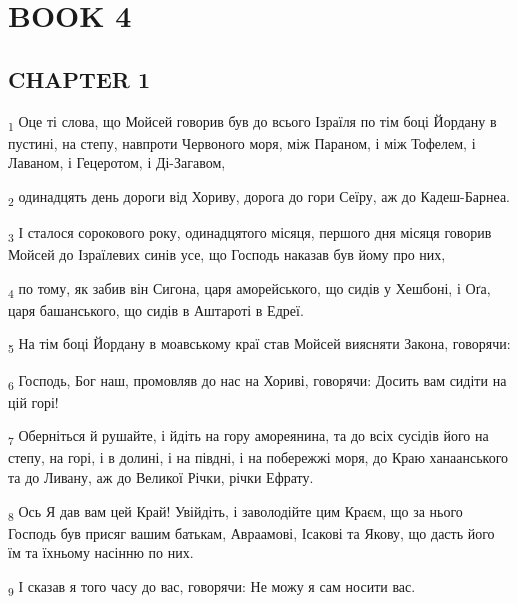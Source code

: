 \section{BOOK 4}
\subsection{CHAPTER 1}
\begin{tcolorbox}
\textsubscript{1} Оце ті слова, що Мойсей говорив був до всього Ізраїля по тім боці Йордану в пустині, на степу, навпроти Червоного моря, між Параном, і між Тофелем, і Лаваном, і Гецеротом, і Ді-Загавом,
\end{tcolorbox}
\begin{tcolorbox}
\textsubscript{2} одинадцять день дороги від Хориву, дорога до гори Сеїру, аж до Кадеш-Барнеа.
\end{tcolorbox}
\begin{tcolorbox}
\textsubscript{3} І сталося сорокового року, одинадцятого місяця, першого дня місяця говорив Мойсей до Ізраїлевих синів усе, що Господь наказав був йому про них,
\end{tcolorbox}
\begin{tcolorbox}
\textsubscript{4} по тому, як забив він Сигона, царя аморейського, що сидів у Хешбоні, і Оґа, царя башанського, що сидів в Аштароті в Едреї.
\end{tcolorbox}
\begin{tcolorbox}
\textsubscript{5} На тім боці Йордану в моавському краї став Мойсей виясняти Закона, говорячи:
\end{tcolorbox}
\begin{tcolorbox}
\textsubscript{6} Господь, Бог наш, промовляв до нас на Хориві, говорячи: Досить вам сидіти на цій горі!
\end{tcolorbox}
\begin{tcolorbox}
\textsubscript{7} Оберніться й рушайте, і йдіть на гору амореянина, та до всіх сусідів його на степу, на горі, і в долині, і на півдні, і на побережжі моря, до Краю ханаанського та до Ливану, аж до Великої Річки, річки Ефрату.
\end{tcolorbox}
\begin{tcolorbox}
\textsubscript{8} Ось Я дав вам цей Край! Увійдіть, і заволодійте цим Краєм, що за нього Господь був присяг вашим батькам, Авраамові, Ісакові та Якову, що дасть його їм та їхньому насінню по них.
\end{tcolorbox}
\begin{tcolorbox}
\textsubscript{9} І сказав я того часу до вас, говорячи: Не можу я сам носити вас.
\end{tcolorbox}
